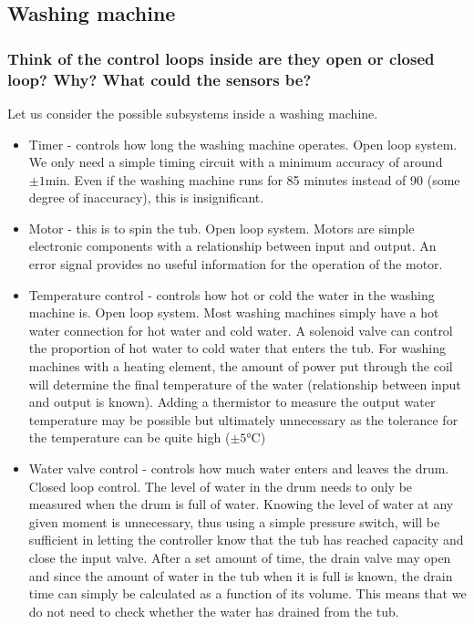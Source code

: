 \subsection*{Washing machine}
\subsubsection*{Think of the control loops inside are they open or closed loop? Why? What could the sensors be?}
Let us consider the possible subsystems inside a washing machine.
\begin{itemize}
  \item Timer - controls how long the washing machine operates. Open loop system. We only need a simple timing circuit with a minimum accuracy of around $\pm 1 \si{\minute}$. Even if the washing machine runs for 85 minutes instead of 90 (some degree of inaccuracy), this is insignificant.
  \item Motor - this is to spin the tub. Open loop system. Motors are simple electronic components with a relationship between input and output. An error signal provides no useful information for the operation of the motor.
  \item Temperature control - controls how hot or cold the water in the washing machine is. Open loop system. Most washing machines simply have a hot water connection for hot water and cold water. A solenoid valve can control the proportion of hot water to cold water that enters the tub. For washing machines with a heating element, the amount of power put through the coil will determine the final temperature of the water (relationship between input and output is known). Adding a thermistor to measure the output water temperature may be possible but ultimately unnecessary as the tolerance for the temperature can be quite high ($\pm 5 \si{\celsius}$)
  \item Water valve control - controls how much water enters and leaves the drum. Closed loop control. The level of water in the drum needs to only be measured when the drum is full of water. Knowing the level of water at any given moment is unnecessary, thus using a simple pressure switch, will be sufficient in letting the controller know that the tub has reached capacity and close the input valve. After a set amount of time, the drain valve may open and since the amount of water in the tub when it is full is known, the drain time can simply be calculated as a function of its volume. This means that we do not need to check whether the water has drained from the tub.
\end{itemize}